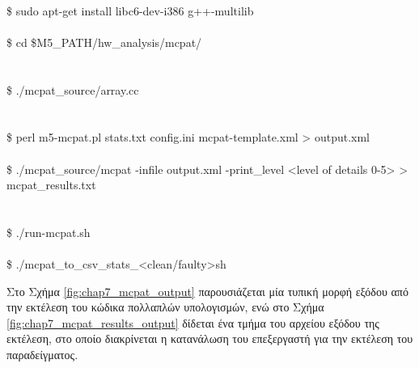 \begin{center}
    \begin{tcolorbox}[width=\linewidth]
        \ttfamily
         \\
        \$ sudo apt-get install libc6-dev-i386 g++-multilib \\
        
         \\
        \$ cd \$M5\_PATH/hw\_analysis/mcpat/ \\
        
         \\
         \\
        \$ ./mcpat\_source/array.cc \\
        
         \\
         \\
        \$ perl m5-mcpat.pl stats.txt config.ini mcpat-template.xml > output.xml \\
         \\
        \$ ./mcpat\_source/mcpat -infile output.xml -print\_level <level of details 0-5>  > mcpat\_results.txt \\
        
         \\
         \\
        \$ ./run-mcpat.sh \\
        
         \\
        \$ ./mcpat\_to\_csv\_stats\_<clean/faulty>sh
    \end{tcolorbox}
\end{center}

Στο Σχήμα \ref{fig:chap7_mcpat_output} παρουσιάζεται μία τυπική μορφή εξόδου από την εκτέλεση του κώδικα πολλαπλών υπολογισμών, ενώ στο Σχήμα \ref{fig:chap7_mcpat_results_output} δίδεται ένα τμήμα του αρχείου εξόδου της εκτέλεση, στο οποίο διακρίνεται η κατανάλωση του επεξεργαστή για την εκτέλεση του παραδείγματος.

